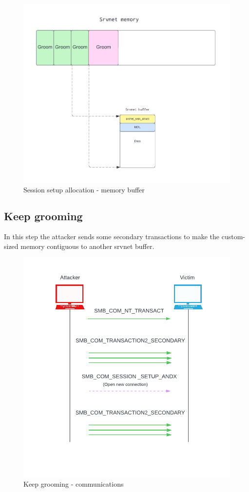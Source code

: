 \begin{figure}[ht!]
    \centering
      \includegraphics[scale=0.5]{images/exploit_2_buff.png}
      \caption{Session setup allocation - memory buffer}
\end{figure}

\clearpage
\subsection{Keep grooming}
In this step the attacker sends some secondary transactions to make the custom-sized memory contiguous to another srvnet buffer.

\begin{figure}[ht!]
    \centering
      \includegraphics[scale=0.5]{images/exploit_3_comm.png}
      \caption{Keep grooming - communications}
\end{figure}

